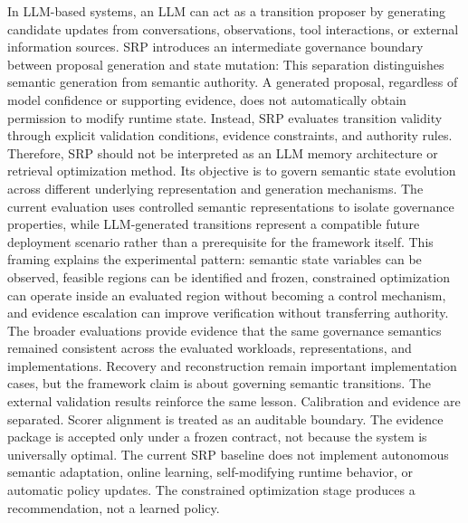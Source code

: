 {}In LLM-based systems, an LLM can act as a transition proposer by generating candidate updates from conversations, observations, tool interactions, or external information sources. SRP introduces an intermediate governance boundary between proposal generation and state mutation:\markdownRendererInterblockSeparator
{}\markdownRendererInterblockSeparator
{}This separation distinguishes semantic generation from semantic authority. A generated proposal, regardless of model confidence or supporting evidence, does not automatically obtain permission to modify runtime state. Instead, SRP evaluates transition validity through explicit validation conditions, evidence constraints, and authority rules.\markdownRendererParagraphSeparator
{}Therefore, SRP should not be interpreted as an LLM memory architecture or retrieval optimization method. Its objective is to govern semantic state evolution across different underlying representation and generation mechanisms. The current evaluation uses controlled semantic representations to isolate governance properties, while LLM-generated transitions represent a compatible future deployment scenario rather than a prerequisite for the framework itself.\markdownRendererParagraphSeparator
{}This framing explains the experimental pattern: semantic state variables can be observed, feasible regions can be identified and frozen, constrained optimization can operate inside an evaluated region without becoming a control mechanism, and evidence escalation can improve verification without transferring authority. The broader evaluations provide evidence that the same governance semantics remained consistent across the evaluated workloads, representations, and implementations. Recovery and reconstruction remain important implementation cases, but the framework claim is about governing semantic transitions.\markdownRendererParagraphSeparator
{}The external validation results reinforce the same lesson. Calibration and evidence are separated. Scorer alignment is treated as an auditable boundary. The evidence package is accepted only under a frozen contract, not because the system is universally optimal.\markdownRendererInterblockSeparator
{}
\markdownRendererSectionEnd 
\markdownRendererSectionEnd \markdownRendererSectionBegin
{}\markdownRendererInterblockSeparator
{}The current SRP baseline does not implement autonomous semantic adaptation, online learning, self-modifying runtime behavior, or automatic policy updates. The constrained optimization stage produces a recommendation, not a learned policy.\markdownRendererParagraphSeparator
